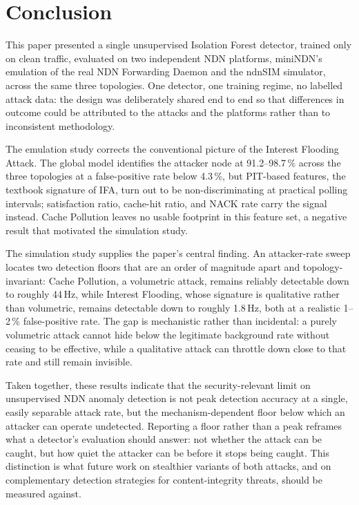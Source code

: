 \section{Conclusion}
\label{sec:conclusion}

This paper presented a single unsupervised Isolation Forest detector, trained only on clean traffic, evaluated on two independent NDN platforms, miniNDN's emulation of the real NDN Forwarding Daemon and the ndnSIM simulator, across the same three topologies. One detector, one training regime, no labelled attack data: the design was deliberately shared end to end so that differences in outcome could be attributed to the attacks and the platforms rather than to inconsistent methodology.

The emulation study corrects the conventional picture of the Interest Flooding Attack. The global model identifies the attacker node at 91.2--98.7\,\% across the three topologies at a false-positive rate below 4.3\,\%, but PIT-based features, the textbook signature of IFA, turn out to be non-discriminating at practical polling intervals; satisfaction ratio, cache-hit ratio, and NACK rate carry the signal instead. Cache Pollution leaves no usable footprint in this feature set, a negative result that motivated the simulation study.

The simulation study supplies the paper's central finding. An attacker-rate sweep locates two detection floors that are an order of magnitude apart and topology-invariant: Cache Pollution, a volumetric attack, remains reliably detectable down to roughly 44\,Hz, while Interest Flooding, whose signature is qualitative rather than volumetric, remains detectable down to roughly 1.8\,Hz, both at a realistic 1--2\,\% false-positive rate. The gap is mechanistic rather than incidental: a purely volumetric attack cannot hide below the legitimate background rate without ceasing to be effective, while a qualitative attack can throttle down close to that rate and still remain invisible.

Taken together, these results indicate that the security-relevant limit on unsupervised NDN anomaly detection is not peak detection accuracy at a single, easily separable attack rate, but the mechanism-dependent floor below which an attacker can operate undetected. Reporting a floor rather than a peak reframes what a detector's evaluation should answer: not whether the attack can be caught, but how quiet the attacker can be before it stops being caught. This distinction is what future work on stealthier variants of both attacks, and on complementary detection strategies for content-integrity threats, should be measured against.
